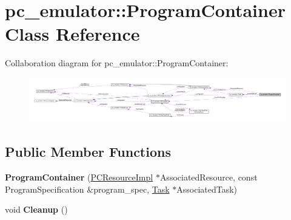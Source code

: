 \hypertarget{classpc__emulator_1_1ProgramContainer}{}\section{pc\+\_\+emulator\+:\+:Program\+Container Class Reference}
\label{classpc__emulator_1_1ProgramContainer}


Collaboration diagram for pc\+\_\+emulator\+:\+:Program\+Container\+:
\nopagebreak
\begin{figure}[H]
\begin{center}
\leavevmode
\includegraphics[width=350pt]{classpc__emulator_1_1ProgramContainer__coll__graph}
\end{center}
\end{figure}
\subsection*{Public Member Functions}
\begin{DoxyCompactItemize}
\item 
{\bfseries Program\+Container} (\hyperlink{classpc__emulator_1_1PCResourceImpl}{P\+C\+Resource\+Impl} $\ast$Associated\+Resource, const Program\+Specification \&program\+\_\+spec, \hyperlink{classpc__emulator_1_1Task}{Task} $\ast$Associated\+Task)\hypertarget{classpc__emulator_1_1ProgramContainer_acb64b6652f369220980eb47dfb047c5e}{}\label{classpc__emulator_1_1ProgramContainer_acb64b6652f369220980eb47dfb047c5e}

\item 
void {\bfseries Cleanup} ()\hypertarget{classpc__emulator_1_1ProgramContainer_a83a369d4f9345d3b8ceba6147f6d87d5}{}\label{classpc__emulator_1_1ProgramContainer_a83a369d4f9345d3b8ceba6147f6d87d5}

\end{DoxyCompactItemize}
